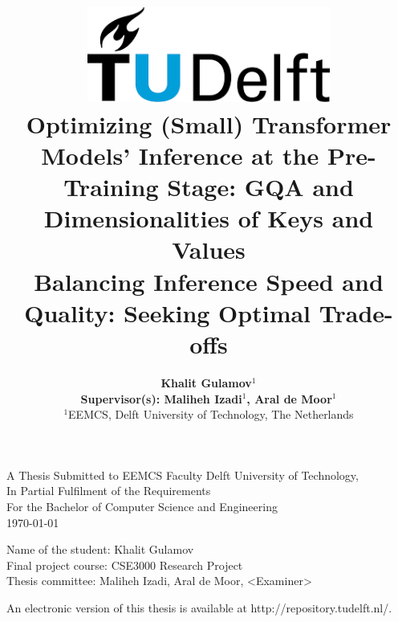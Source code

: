 \title{
    \includegraphics[width=8cm, keepaspectratio]{tudelftlogo.png}\\
    \vspace*{2cm}
    \textbf{
        Optimizing (Small) Transformer Models' Inference at the Pre-Training Stage: GQA and Dimensionalities of Keys and Values  \\
        {\large Balancing Inference Speed and Quality: Seeking Optimal Trade-offs}
    }\\
    \vspace*{1cm}
}

\author{
    \textbf{
    Khalit Gulamov$^1$}\\
    \hfill \break
    \textbf{Supervisor(s): Maliheh Izadi$^1$, Aral de Moor$^1$ }\\
    \break
    {\large 
        \hfill \break
        $^1$EEMCS, Delft University of Technology, The Netherlands
    }\\
}

\date{}

\maketitle
\thispagestyle{empty}

\let\clearpagebackup\clearpage
\renewcommand{\clearpage}{ }

\onecolumn

\vspace*{1.5cm}
\begin{center}
    A Thesis Submitted to EEMCS Faculty Delft University of Technology,\\
    In Partial Fulfilment of the Requirements\\
    For the Bachelor of Computer Science and Engineering\\
    \today
\end{center}

\vspace*{2cm}

\noindent
{\small
Name of the student:  Khalit Gulamov\\
Final project course: CSE3000 Research Project\\
Thesis committee: Maliheh Izadi, Aral de Moor, \textless Examiner\textgreater\\
}
\vfill

\begin{center}
    An electronic version of this thesis is available at http://repository.tudelft.nl/.
\end{center}

\twocolumn
\let\clearpage\clearpagebackup  
\clearpage
\setcounter{page}{1}
